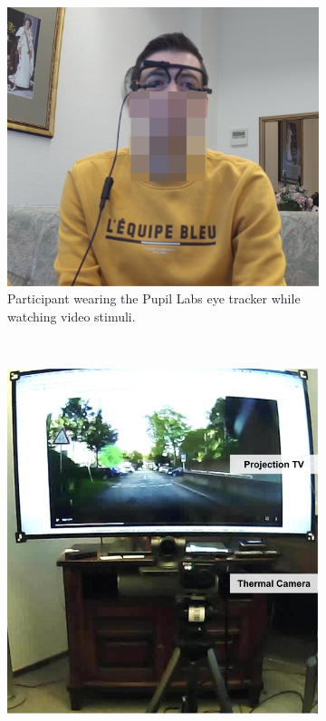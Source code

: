 \documentclass[acmlarge]{acmart}
\begin{document}
\begin{figure}[!htbp]
    \centering	
        \begin{subfigure}[t]{0.32\textwidth}
        \centering        
        \includegraphics[width=\linewidth]{./images/anon_participant.png}
        \caption{Participant wearing the Pupil Labs eye tracker while watching video stimuli.}
        \label{fig:particpant_wearing_eye_tracker}
        \end{subfigure}%
        ~
        \begin{subfigure}[t]{0.27\textwidth}
        \centering        
        \includegraphics[width=\linewidth]{./images//val_study_setup.jpg}

\end{subfigure}
\end{figure}
\end{document}
